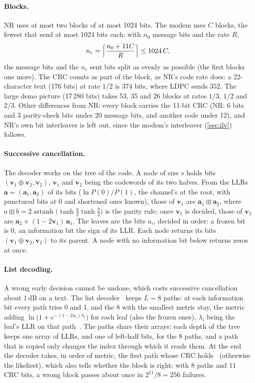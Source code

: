 \documentclass[11pt,a4paper]{article}
\newcommand{\dB}{\,\mathrm{dB}}
\newcommand{\nc}{n_{\mathrm{c}}}
\newcommand{\nz}{n_{0}}
\theoremstyle{remark}
\begin{document}
\paragraph{Blocks.}
NR uses at most two blocks of at most 1024 bits. The modem uses $C$ blocks, the fewest that send at most 1024 bits each: with $\nz$ message bits and the rate $R$,
\begin{equation}
\nc = \Bigl\lceil \frac{\nz + 11 C}{R} \Bigr\rceil \le 1024\, C,
\end{equation}
the message bits and the $\nc$ sent bits split as evenly as possible (the first blocks one more). The CRC counts as part of the block, as NR's code rate does: a 22-character text (176 bits) at rate $1/2$ is $374$ bits, where LDPC sends $352$. The large demo picture (17\,280 bits) takes 53, 35 and 26 blocks at rates $1/3$, $1/2$ and $2/3$. Other differences from NR: every block carries the 11-bit CRC (NR: 6 bits and 3 parity-check bits under 20 message bits, and another code under 12), and NR's own bit interleaver is left out, since the modem's interleaver (\cref{sec:ilv}) follows.

\paragraph{Successive cancellation.}
The decoder works on the tree of the code. A node of size $s$ holds bits $(\bm v_1 \oplus \bm v_2, \bm v_2)$, $\bm v_1$ and $\bm v_2$ being the codewords of its two halves. From the LLRs $\bm a = (\bm a_1, \bm a_2)$ of its bits ($\ln P(0)/P(1)$, the channel's at the root, with punctured bits at 0 and shortened ones known), those of $\bm v_1$ are $\bm a_1 \boxplus \bm a_2$, where $a \boxplus b = 2 \operatorname{artanh}\bigl(\tanh\frac a2 \tanh\frac b2\bigr)$ is the parity rule; once $\bm v_1$ is decided, those of $\bm v_2$ are $\bm a_2 + (1 - 2\bm v_1)\, \bm a_1$. The leaves are the bits $u_i$, decided in order: a frozen bit is 0, an information bit the sign of its LLR. Each node returns its bits $(\bm v_1 \oplus \bm v_2, \bm v_2)$ to its parent. A node with no information bit below returns zeros at once.

\paragraph{List decoding.}
A wrong early decision cannot be undone, which costs successive cancellation about $1\dB$ on a text. The list decoder~\cite{talvardy} keeps $L = 8$ paths: at each information bit every path tries 0 and 1, and the 8 with the smallest metric stay, the metric adding $\ln\bigl(1 + e^{-(1 - 2u_i)\lambda_i}\bigr)$ for each leaf (also the frozen ones), $\lambda_i$ being the leaf's LLR on that path~\cite{balatsoukas}. The paths share their arrays: each depth of the tree keeps one array of LLRs, and one of left-half bits, for the 8 paths, and a path that is copied only changes the index through which it reads them. At the end the decoder takes, in order of metric, the first path whose CRC holds~\cite{niuchen,talvardy} (otherwise the likeliest), which also tells whether the block is right: with 8 paths and 11 CRC bits, a wrong block passes about once in $2^{11}/8 = 256$ failures.
\end{document}
